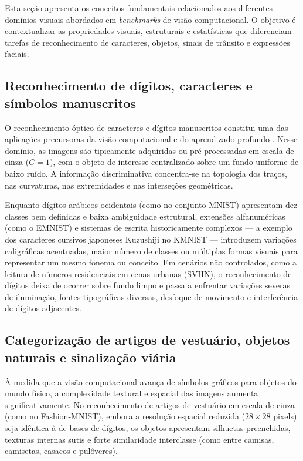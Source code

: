 \documentclass[
    12pt,
    openright,
    oneside,
    a4paper,
    english,
    brazil
]{abntex2}
\begin{document}
Esta seção apresenta os conceitos fundamentais relacionados aos diferentes domínios visuais abordados em \textit{benchmarks} de visão computacional. O objetivo é contextualizar as propriedades visuais, estruturais e estatísticas que diferenciam tarefas de reconhecimento de caracteres, objetos, sinais de trânsito e expressões faciais.

\subsection{Reconhecimento de dígitos, caracteres e símbolos manuscritos}

O reconhecimento óptico de caracteres e dígitos manuscritos constitui uma das aplicações precursoras da visão computacional e do aprendizado profundo \cite{LeCun2015}. Nesse domínio, as imagens são tipicamente adquiridas ou pré-processadas em escala de cinza (\(C=1\)), com o objeto de interesse centralizado sobre um fundo uniforme de baixo ruído. A informação discriminativa concentra-se na topologia dos traços, nas curvaturas, nas extremidades e nas interseções geométricas.

Enquanto dígitos arábicos ocidentais (como no conjunto MNIST) apresentam dez classes bem definidas e baixa ambiguidade estrutural, extensões alfanuméricas (como o EMNIST) e sistemas de escrita historicamente complexos --- a exemplo dos caracteres cursivos japoneses Kuzushiji no KMNIST --- introduzem variações caligráficas acentuadas, maior número de classes ou múltiplas formas visuais para representar um mesmo fonema ou conceito. Em cenários não controlados, como a leitura de números residenciais em cenas urbanas (SVHN), o reconhecimento de dígitos deixa de ocorrer sobre fundo limpo e passa a enfrentar variações severas de iluminação, fontes tipográficas diversas, desfoque de movimento e interferência de dígitos adjacentes.

\subsection{Categorização de artigos de vestuário, objetos naturais e sinalização viária}

À medida que a visão computacional avança de símbolos gráficos para objetos do mundo físico, a complexidade textural e espacial das imagens aumenta significativamente. No reconhecimento de artigos de vestuário em escala de cinza (como no Fashion-MNIST), embora a resolução espacial reduzida (\(28 \times 28\) pixels) seja idêntica à de bases de dígitos, os objetos apresentam silhuetas preenchidas, texturas internas sutis e forte similaridade interclasse (como entre camisas, camisetas, casacos e pulôveres).
\end{document}

